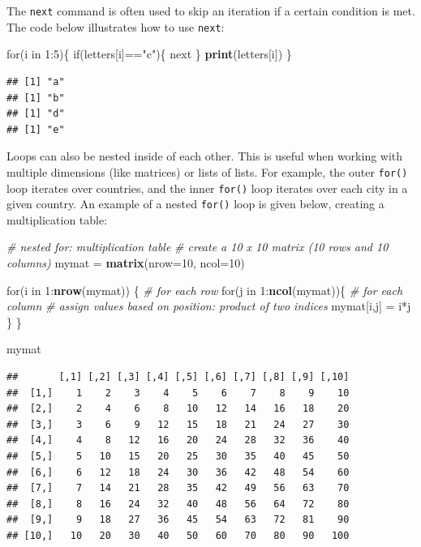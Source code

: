 \documentclass[]{book}
\newenvironment{Shaded}{\begin{snugshade}}{\end{snugshade}}
\newcommand{\KeywordTok}[1]{\textcolor[rgb]{0.13,0.29,0.53}{\textbf{{#1}}}}
\newcommand{\DataTypeTok}[1]{\textcolor[rgb]{0.13,0.29,0.53}{{#1}}}
\newcommand{\DecValTok}[1]{\textcolor[rgb]{0.00,0.00,0.81}{{#1}}}
\newcommand{\StringTok}[1]{\textcolor[rgb]{0.31,0.60,0.02}{{#1}}}
\newcommand{\CommentTok}[1]{\textcolor[rgb]{0.56,0.35,0.01}{\textit{{#1}}}}
\newcommand{\NormalTok}[1]{{#1}}
\begin{document}
The \texttt{next} command is often used to skip an iteration if a
certain condition is met. The code below illustrates how to use
\texttt{next}:

\begin{Shaded}
\begin{Highlighting}[]
\NormalTok{for(i in }\DecValTok{1}\NormalTok{:}\DecValTok{5}\NormalTok{)\{}
  \NormalTok{if(letters[i]==}\StringTok{"c"}\NormalTok{)\{}
    \NormalTok{next}
  \NormalTok{\}}
  \KeywordTok{print}\NormalTok{(letters[i])}
\NormalTok{\}}
\end{Highlighting}
\end{Shaded}

\begin{verbatim}
## [1] "a"
## [1] "b"
## [1] "d"
## [1] "e"
\end{verbatim}

Loops can also be nested inside of each other. This is useful when
working with multiple dimensions (like matrices) or lists of lists. For
example, the outer \texttt{for()} loop iterates over countries, and the
inner \texttt{for()} loop iterates over each city in a given country. An
example of a nested \texttt{for()} loop is given below, creating a
multiplication table:

\begin{Shaded}
\begin{Highlighting}[]
\CommentTok{# nested for: multiplication table}
\CommentTok{# create a 10 x 10 matrix (10 rows and 10 columns)}
\NormalTok{mymat =}\StringTok{ }\KeywordTok{matrix}\NormalTok{(}\DataTypeTok{nrow=}\DecValTok{10}\NormalTok{, }\DataTypeTok{ncol=}\DecValTok{10}\NormalTok{) }

\NormalTok{for(i in }\DecValTok{1}\NormalTok{:}\KeywordTok{nrow}\NormalTok{(mymat)) \{  }\CommentTok{# for each row}
  \NormalTok{for(j in }\DecValTok{1}\NormalTok{:}\KeywordTok{ncol}\NormalTok{(mymat))\{ }\CommentTok{# for each column}
    \CommentTok{# assign values based on position: product of two indices}
    \NormalTok{mymat[i,j] =}\StringTok{ }\NormalTok{i*j     }
  \NormalTok{\}}
\NormalTok{\}}

\NormalTok{mymat}
\end{Highlighting}
\end{Shaded}

\begin{verbatim}
##       [,1] [,2] [,3] [,4] [,5] [,6] [,7] [,8] [,9] [,10]
##  [1,]    1    2    3    4    5    6    7    8    9    10
##  [2,]    2    4    6    8   10   12   14   16   18    20
##  [3,]    3    6    9   12   15   18   21   24   27    30
##  [4,]    4    8   12   16   20   24   28   32   36    40
##  [5,]    5   10   15   20   25   30   35   40   45    50
##  [6,]    6   12   18   24   30   36   42   48   54    60
##  [7,]    7   14   21   28   35   42   49   56   63    70
##  [8,]    8   16   24   32   40   48   56   64   72    80
##  [9,]    9   18   27   36   45   54   63   72   81    90
## [10,]   10   20   30   40   50   60   70   80   90   100
\end{verbatim}
\end{document}
